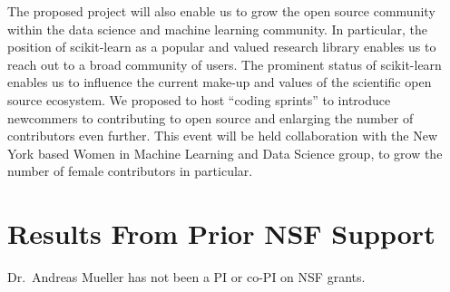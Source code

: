 The proposed project will also enable us to grow the open source community
within the data science and machine learning community.
In particular, the position of scikit-learn as a popular and valued
research library enables us to reach out to a broad community of users.
The prominent status of scikit-learn enables us to influence
the current make-up and values of the scientific open source ecosystem.
We proposed to host ``coding sprints'' to introduce
newcommers to contributing to open source and enlarging the
number of contributors even further. This event will be held collaboration with
the New York based Women in Machine Learning and Data Science group, to grow
the number of female contributors in particular. 


\section{Results From Prior NSF Support}
Dr.\ Andreas Mueller has not been a PI or co-PI on NSF grants.


